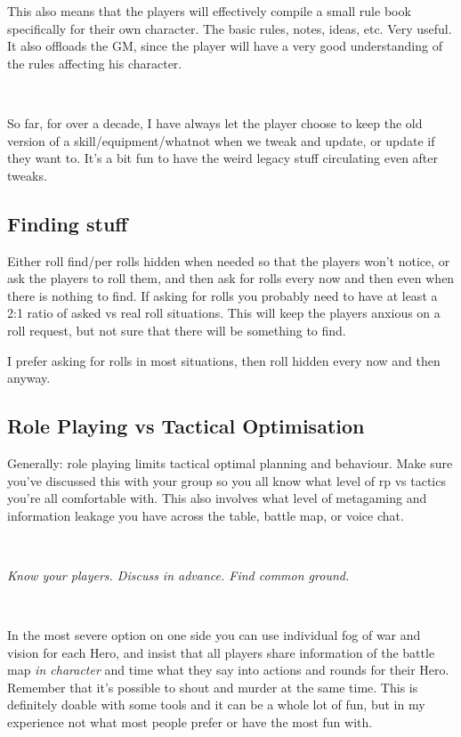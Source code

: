 This also means that the players will effectively compile a small rule book specifically for their own character. The basic rules, notes, ideas, etc. Very useful. It also offloads the GM, since the player will have a very good understanding of the rules affecting his character.

\

So far, for over a decade, I have always let the player choose to keep the old version of a skill/equipment/whatnot when we tweak and update, or update if they want to.
It's a bit fun to have the weird legacy stuff circulating even after tweaks.


\subsection*{Finding stuff}
Either roll find/per rolls hidden when needed so that the players won't notice, or ask the players to roll them, and then ask for rolls every now and then even when there is nothing to find. If asking for rolls you probably need to have at least a 2:1 ratio of asked vs real roll situations. This will keep the players anxious on a roll request, but not sure that there will be something to find.

I prefer asking for rolls in most situations, then roll hidden every now and then anyway.


\subsection*{Role Playing vs Tactical Optimisation}
Generally: role playing limits tactical optimal planning and behaviour. Make sure you've discussed this with your group so you all know what level of rp vs tactics you're all comfortable with. This also involves what level of metagaming and information leakage you have across the table, battle map, or voice chat.

\

\noindent \emph{Know your players. Discuss in advance. Find common ground.}

\

In the most severe option on one side you can use individual fog of war and vision for each Hero, and insist that all players share information of the battle map \emph{in character} and time what they say into actions and rounds for their Hero. Remember that it's possible to shout and murder at the same time. This is definitely doable with some tools and it can be a whole lot of fun, but in my experience not what most people prefer or have the most fun with.

